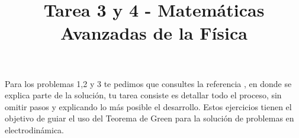 
\usepackage{standalone}
\usepackage{enumerate}
\usepackage{hyperref}
\usepackage[left=1.5cm,top=1.5cm,right=1.5cm,bottom=1.5cm]{geometry}
\title{Tarea 3 y 4 - Matemáticas Avanzadas de la Física}
\date{ }

\vspace{-4cm}
\renewcommand\labelenumii{\theenumi.{\arabic{enumii}}}
\maketitle
\fontsize{14}{14}\selectfont
Para los problemas 1,2 y 3 te pedimos que consultes la referencia \cite[pág. 45]{Greiner}, en donde se explica parte de la solución, tu tarea consiste es detallar todo el proceso, sin omitir pasos y explicando lo más posible el desarrollo. Estos ejercicios tienen el objetivo de guiar el uso del Teorema de Green para la solución de problemas en electrodinámica.
